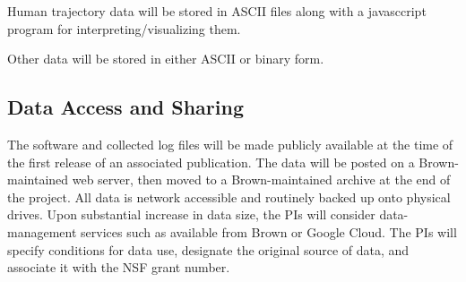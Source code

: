 Human trajectory data will be stored in ASCII files along with a
javasccript program for interpreting/visualizing them.

Other data will be stored in either ASCII or binary form.

\subsection*{Data Access and Sharing}

The software and collected log files will be made publicly available
at the time of the first release of an associated publication. The
data will be posted on a Brown-maintained web server, then moved to a
Brown-maintained archive at the end of the project. All data is
network accessible and routinely backed up onto physical drives. Upon
substantial increase in data size, the PIs will consider
data-management services such as available from Brown or Google
Cloud. The PIs will specify conditions for data use, designate the
original source of data, and associate it with the NSF grant number.
